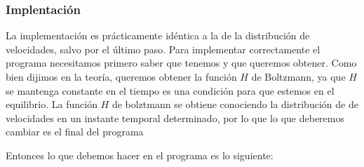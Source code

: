 \documentclass[11pt]{article} %
\begin{document}
\subsubsection{Implentación}

La implementación es prácticamente idéntica a la de la distribución de velocidades, salvo por el último paso. Para implementar correctamente el programa necesitamos primero saber que tenemos y que queremos obtener. Como bien dijimos en la teoría, queremos obtener la función $H$ de Boltzmann, ya que $H$ se mantenga constante en el tiempo es una condición para que estemos en el equilibrio. La función $H$ de bolztmann se obtiene conociendo la distribución de de velocidades en un instante temporal determinado, por lo que lo que deberemos cambiar es el final del programa

Entonces lo que debemos hacer en el programa es lo siguiente:
\end{document}
